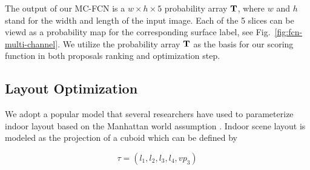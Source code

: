 The output of our MC-FCN is a $w\times h \times 5$ probability array $\mathbf{T}$, where $w$ and $h$ stand for the width and length of the input image. Each of the 5 slices can be viewd as a probability map for the corresponding surface label, see Fig.~\ref{fig:fcn-multi-channel}. We utilize the probability array $\mathbf{T}$ as the basis for our scoring function in both proposals ranking and optimization step. 


\subsection{Layout Optimization}
\label{sec:optimization}
We adopt a popular model that several researchers \cite{hedau2009recovering, wang2013discriminative, dasgupta2016delay, ren2016coarse} have used to parameterize indoor layout based on the Manhattan world assumption \cite{coughlan1999manhattan}. Indoor scene layout is modeled as the projection of a cuboid which can be defined by 

\begin{equation}
	\label{eq:Layout}
	\tau = (l_1, l_2, l_3, l_4, vp_3)
\end{equation}

